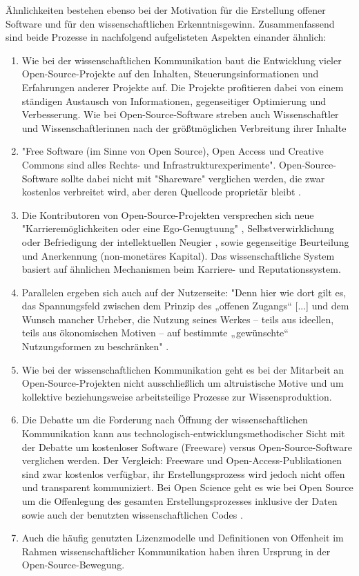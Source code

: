 Ähnlichkeiten bestehen ebenso bei der Motivation für die Erstellung offener Software und für den wissenschaftlichen Erkenntnisgewinn. Zusammenfassend sind beide Prozesse in nachfolgend aufgelisteten Aspekten einander ähnlich:
\begin{enumerate}
\item Wie bei der wissenschaftlichen Kommunikation baut die Entwicklung vieler Open-Source-Projekte auf den Inhalten, Steuerungsinformationen und Erfahrungen anderer Projekte auf. Die Projekte profitieren dabei von einem ständigen Austausch von Informationen, gegenseitiger Optimierung und Verbesserung. Wie bei Open-Source-Software streben auch Wissenschaftler und Wissenschaftlerinnen nach der größtmöglichen Verbreitung ihrer Inhalte
\item "Free Software (im Sinne von Open Source), Open Access und Creative Commons sind alles Rechts- und Infrastrukturexperimente"\cite{kelty_2004}. Open-Source-Software sollte dabei nicht mit "Shareware" verglichen werden, die zwar kostenlos verbreitet wird, aber deren Quellcode proprietär bleibt \cite{Lerner_2001}.
\item Die Kontributoren von Open-Source-Projekten versprechen sich neue "Karrieremöglichkeiten oder eine Ego-Genugtuung" \cite{Lerner_2001}, Selbstverwirklichung oder Befriedigung der intellektuellen Neugier \cite{Willinsky_2005}, sowie gegenseitige Beurteilung und Anerkennung (non-monetäres Kapital). Das wissenschaftliche System basiert auf ähnlichen Mechanismen beim Karriere- und Reputationssystem.
\item Parallelen ergeben sich auch auf der Nutzerseite: "Denn hier wie dort gilt es, das Spannungsfeld zwischen dem Prinzip des „offenen Zugangs“ [...] und dem Wunsch mancher Urheber, die Nutzung seines Werkes – teils aus ideellen, teils aus ökonomischen Motiven – auf bestimmte „gewünschte“ Nutzungsformen zu beschränken" \cite{dorschel_2006_open}.
\item Wie bei der wissenschaftlichen Kommunikation geht es bei der Mitarbeit an Open-Source-Projekten nicht ausschließlich um altruistische Motive \cite{Lerner_2001} und um kollektive beziehungsweise arbeitsteilige Prozesse zur Wissensproduktion.
\item Die Debatte um die Forderung nach Öffnung der wissenschaftlichen Kommunikation kann aus technologisch-entwicklungsmethodischer Sicht mit der Debatte um kostenloser Software (Freeware) versus Open-Source-Software verglichen werden. Der Vergleich: Freeware und Open-Access-Publikationen sind zwar kostenlos verfügbar, ihr Erstellungsprozess wird jedoch nicht offen und transparent kommuniziert. Bei Open Science geht es wie bei Open Source um die Offenlegung des gesamten Erstellungsprozesses inklusive der Daten \cite{grand_2012_open} sowie auch der benutzten wissenschaftlichen Codes \cite{hey_2015_open}.
\item Auch die häufig genutzten Lizenzmodelle und Definitionen von Offenheit im Rahmen wissenschaftlicher Kommunikation haben ihren Ursprung in der Open-Source-Bewegung.
\end{enumerate}

